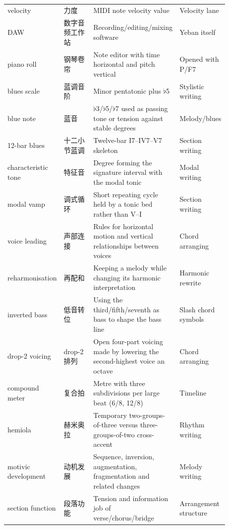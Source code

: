 \begin{center}
\begin{longtable}{p{0.20\linewidth}p{0.16\linewidth}p{0.34\linewidth}p{0.18\linewidth}}
velocity & 力度 & MIDI note velocity value & Velocity lane \\
DAW & 数字音频工作站 & Recording/editing/mixing software & Yeban itself \\
piano roll & 钢琴卷帘 & Note editor with time horizontal and pitch vertical & Opened with P/F7 \\
blues scale & 蓝调音阶 & Minor pentatonic plus \(\flat\)5 & Stylistic writing \\
blue note & 蓝音 & \(\flat\)3/\(\flat\)5/\(\flat\)7 used as passing tone or tension against stable degrees & Melody/blues \\
12-bar blues & 十二小节蓝调 & Twelve-bar I7--IV7--V7 skeleton & Section writing \\
characteristic tone & 特征音 & Degree forming the signature interval with the modal tonic & Modal writing \\
modal vamp & 调式循环 & Short repeating cycle held by a tonic bed rather than V--I & Section writing \\
voice leading & 声部连接 & Rules for horizontal motion and vertical relationships between voices & Chord arranging \\
reharmonisation & 再配和 & Keeping a melody while changing its harmonic interpretation & Harmonic rewrite \\
inverted bass & 低音转位 & Using the third/fifth/seventh as bass to shape the bass line & Slash chord symbols \\
drop-2 voicing & drop-2 排列 & Open four-part voicing made by lowering the second-highest voice an octave & Chord arranging \\
compound meter & 复合拍 & Metre with three subdivisions per large beat (6/8, 12/8) & Timeline \\
hemiola & 赫米奥拉 & Temporary two-groups-of-three versus three-groups-of-two cross-accent & Rhythm writing \\
motivic development & 动机发展 & Sequence, inversion, augmentation, fragmentation and related changes & Melody writing \\
section function & 段落功能 & Tension and information job of verse/chorus/bridge & Arrangement structure \\
\bottomrule
\end{longtable}
\end{center}
